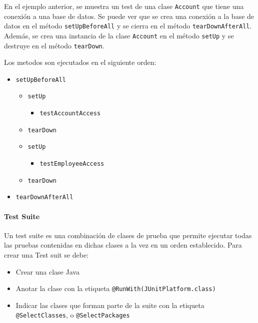 \begin{paracol}{2}
	
	\colfill
	En el ejemplo anterior, se muestra un test de una clase \texttt{Account} que tiene una conexión a una base de datos. Se puede ver que se crea una conexión a la base de datos en el método \texttt{setUpBeforeAll} y se cierra en el método \texttt{tearDownAfterAll}. Además, se crea una instancia de la clase \texttt{Account} en el método \texttt{setUp} y se destruye en el método \texttt{tearDown}.
	\colfill
	
	\switchcolumn
	Los metodos son ejecutados en el siguiente orden:
	\ns
 \begin{itemize}
	\item \lstinline|setUpBeforeAll|
	      \begin{itemize}
		      \item \lstinline|setUp|
		            \begin{itemize}
			            \item \lstinline|testAccountAccess|
		            \end{itemize}
		      \item \lstinline|tearDown|
		      \item \lstinline|setUp|
		            \begin{itemize}
			            \item \lstinline|testEmployeeAccess|
		            \end{itemize}
		      \item \lstinline|tearDown|

	      \end{itemize}
	\item \lstinline|tearDownAfterAll|
\end{itemize}
\end{paracol}

\paragraph{Test Suite}
Un test suite es una combinación de clases de prueba que
permite ejecutar todas las pruebas contenidas en dichas
clases a la vez en un orden establecido.
Para crear una Test suit se debe:
\begin{itemize}
	\item Crear una clase Java
	\item Anotar la clase con la etiqueta \lstinline|@RunWith(JUnitPlatform.class)|
	\item Indicar las clases que forman parte de la suite con la
etiqueta \lstinline|@SelectClasses|, o \lstinline|@SelectPackages|
\end{itemize}


